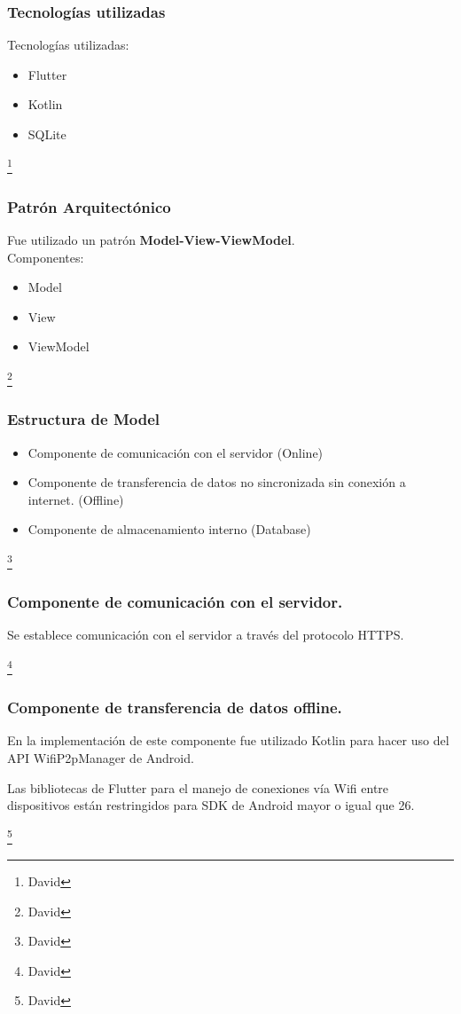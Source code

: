 \documentclass[14pt]{beamer}
\begin{document}
\begin{frame}
\frametitle{Tecnologías utilizadas}

Tecnologías utilizadas:
\begin{itemize}
\item Flutter
\item Kotlin
\item SQLite
\end{itemize}
\footnote{David}
\end{frame}


\begin{frame}
\frametitle{Patrón Arquitectónico}

Fue utilizado un patrón \textbf{Model-View-ViewModel}.
\\
Componentes:
\begin{itemize}
\item Model
\item View
\item ViewModel
\end{itemize}

\footnote{David}
\end{frame}





\begin{frame}
\frametitle{Estructura de Model}

\begin{itemize}
\item Componente de comunicación con el servidor (Online)

\item Componente de transferencia de datos no sincronizada sin conexión a internet. (Offline)

\item Componente de almacenamiento interno (Database)

\end{itemize}

\footnote{David}
\end{frame}

\begin{frame}
\frametitle{Componente de comunicación con el servidor.}

\begin{block}{}
Se establece comunicación con el servidor a través del protocolo HTTPS.
\end{block}
\footnote{David}
\end{frame}

\begin{frame}
\frametitle{Componente de transferencia de datos offline.}

\begin{block}{}
En la implementación de este componente fue utilizado Kotlin para hacer uso del API WifiP2pManager de Android.

Las bibliotecas de Flutter para el manejo de conexiones vía Wifi entre dispositivos están restringidos para SDK de Android mayor o igual que 26.
\end{block}
\footnote{David}
\end{frame}
\end{document}
